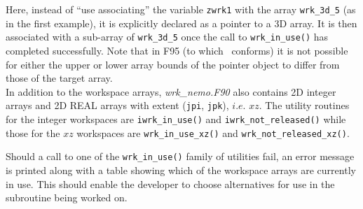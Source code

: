 Here, instead of ``use associating'' the variable \texttt{zwrk1} with the array \texttt{wrk\_3d\_5}
(as in the first example), it is explicitly declared as a pointer to a 3D array.
It is then associated with a sub-array of \texttt{wrk\_3d\_5} once the call to
\texttt{wrk\_in\_use()} has completed successfully.
Note that in F95 (to which \NEMO\ conforms) it is not possible for either the upper or lower array bounds of
the pointer object to differ from those of the target array. \\

In addition to the  workspace arrays,
\textit{wrk\_nemo.F90} also contains 2D integer arrays and 2D REAL arrays with extent (\texttt{jpi}, \texttt{jpk}),
$i.e.$ $xz$.
The utility routines for the integer workspaces are \texttt{iwrk\_in\_use()} and \texttt{iwrk\_not\_released()} while
those for the $xz$ workspaces are \texttt{wrk\_in\_use\_xz()} and \texttt{wrk\_not\_released\_xz()}.

Should a call to one of the \texttt{wrk\_in\_use()} family of utilities fail,
an error message is printed along with a table showing which of the workspace arrays are currently in use.
This should enable the developer to choose alternatives for use in the subroutine being worked on. \\

